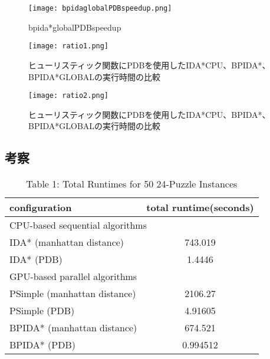 \documentclass[a4paper,11pt,oneside,openany]{jsbook}
\begin{document}
\begin{figure}[hbtp]
\begin{center}
\texttt{[image: bpidaglobalPDBspeedup.png]}
\caption{bpida*globalPDBspeedup}
\end{center}
\end{figure}


\begin{figure}[hbtp]
\begin{minipage}{0.5\hsize}
\begin{center}
\texttt{[image: ratio1.png]}
\caption{ヒューリスティック関数にPDBを使用したIDA*CPU、BPIDA*、BPIDA*GLOBALの実行時間の比較}
\end{center}
\end{minipage}
\begin{minipage}{0.5\hsize}
\begin{center}
\texttt{[image: ratio2.png]}
\caption{ヒューリスティック関数にPDBを使用したIDA*CPU、BPIDA*、BPIDA*GLOBALの実行時間の比較}
\end{center}
\end{minipage}
\end{figure}

\subsection{考察}





\begin{table}[]
\centering
\caption{Table 1: Total Runtimes for 50 24-Puzzle Instances}
\label{my-label}
\begin{tabular}{|l|c|}
\hline
configuration & \multicolumn{1}{l|}{total runtime(seconds)} \\ \hline
\multicolumn{2}{|l|}{CPU-based sequential algorithms} \\ \hline
IDA* (manhattan distance) & 743.019 \\
IDA* (PDB) & 1.4446 \\ \hline
\multicolumn{2}{|l|}{GPU-based parallel algorithms} \\ \hline
PSimple (manhattan distance) & 2106.27 \\
PSimple (PDB) & 4.91605 \\
BPIDA* (manhattan distance) & 674.521 \\
BPIDA* (PDB) & 0.994512 \\ \hline
\end{tabular}
\end{table}
\end{document}
